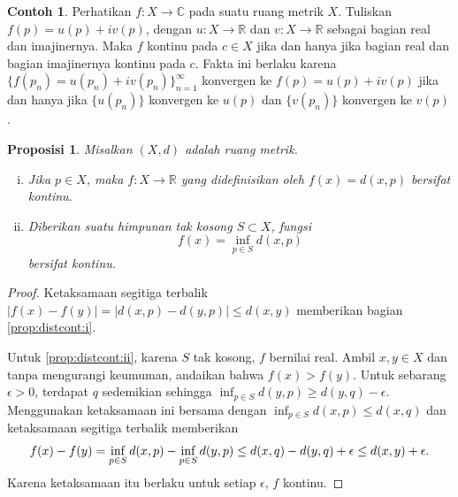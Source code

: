 \documentclass[12pt,openany]{book}
\newcommand{\avoidbreak}{\postdisplaypenalty=100}
\newcommand{\sabs}[1]{\lvert {#1} \rvert}
\newcommand{\C}{{\mathbb{C}}}
\newcommand{\R}{{\mathbb{R}}}
\theoremstyle{plain}
\newtheorem{prop}[thm]{Proposisi}
\theoremstyle{remark}
\theoremstyle{definition}
\theoremstyle{exercise}
\theoremstyle{example}
\newtheorem{example}[thm]{Contoh}
\begin{document}
\begin{example}
Perhatikan
$f \colon X \to \C$ 
pada suatu ruang metrik $X$.
Tuliskan $f(p) = u(p) + i v(p)$, dengan $u \colon X \to \R$
dan $v \colon X \to \R$ sebagai bagian real dan imajinernya.
Maka $f$ kontinu pada $c \in X$ jika dan hanya jika bagian real
dan bagian imajinernya kontinu pada $c$.  
Fakta ini berlaku karena $\bigl\{ f(p_n) = u(p_n) + i v(p_n) \bigr\}_{n=1}^\infty$
konvergen ke $f(p) = u(p) + i v(p)$ jika dan hanya jika
$\bigl\{ u(p_n) \bigr\}$ konvergen ke $u(p)$ dan
$\bigl\{ v(p_n) \bigr\}$ konvergen ke $v(p)$.
\end{example}

\begin{prop}\label{prop:distcont}
Misalkan $(X,d)$ adalah ruang metrik.
\begin{enumerate}[(i)]
\item\label{prop:distcont:i}
Jika $p \in X$,
maka $f \colon X \to \R$ yang didefinisikan
oleh $f(x) = d(x,p)$ bersifat kontinu.
\item\label{prop:distcont:ii}
Diberikan suatu himpunan tak kosong $S \subset X$, fungsi
\begin{equation*}
f(x) = \inf_{p \in S} d(x,p)
\end{equation*}
bersifat kontinu.
\end{enumerate}
\end{prop}

\begin{proof}
Ketaksamaan segitiga terbalik
$\sabs{f(x)-f(y)} = \sabs{d(x,p)-d(y,p)} \leq d(x,y)$
memberikan bagian \ref{prop:distcont:i}.

Untuk \ref{prop:distcont:ii}, karena $S$ tak kosong, $f$
bernilai real.  Ambil $x,y \in X$ dan tanpa mengurangi keumuman, andaikan
bahwa $f(x) > f(y)$.
Untuk sebarang $\epsilon > 0$, terdapat $q$ sedemikian sehingga
$\inf_{p \in S} d(y,p) \geq d(y,q) - \epsilon$.
Menggunakan ketaksamaan ini bersama dengan
$\inf_{p \in S} d(x,p) \leq d(x,q)$ dan
ketaksamaan segitiga terbalik memberikan
\begin{equation*}
f(x)-f(y) =
\inf_{p \in S} d(x,p)
-
\inf_{p \in S} d(y,p)
\leq
d(x,q) - d(y,q) + \epsilon 
\leq d(x,y) + \epsilon.
\avoidbreak
\end{equation*}
Karena ketaksamaan itu berlaku untuk setiap $\epsilon$, $f$ kontinu.
\end{proof}
\end{document}
